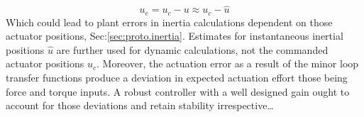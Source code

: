 \begin{equation}\label{eq:actuator-error}
u_e=u_c-u\approx u_c-\hat{u}
\end{equation}
Which could lead to plant errors in inertia calculations dependent on those actuator positions, Sec:\ref{sec:proto.inertia}. Estimates for instantaneous inertial positions $\hat{u}$ are further used for dynamic calculations, not the commanded actuator positions $u_c$. Moreover, the actuation error as a result of the minor loop transfer functions produce a deviation in expected actuation effort those being force and torque inputs. A robust controller with a well designed gain ought to account for those deviations and retain stability irrespective\ldots
